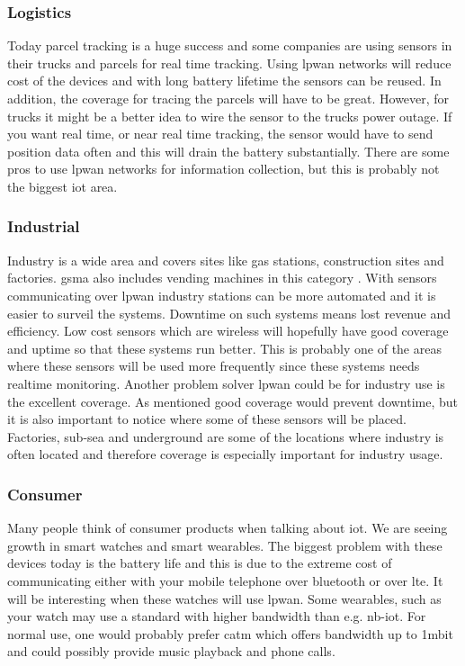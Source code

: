 \documentclass[USenglish]{ifimaster}  %
\begin{document}
\subsubsection{Logistics}
Today parcel tracking is a huge success and some companies are using sensors in their trucks and parcels for real time tracking. Using \acrshort{lpwan} networks will reduce cost of the devices and with long battery lifetime the sensors can be reused. In addition, the coverage for tracing the parcels will have to be great. However, for trucks it might be a better idea to wire the sensor to the trucks power outage. If you want real time, or near real time tracking, the sensor would have to send position data often and this will drain the battery substantially. There are some pros to use \acrshort{lpwan} networks for information collection, but this is probably not the biggest \acrshort{iot} area.

\subsubsection{Industrial}
Industry is a wide area and covers sites like gas stations, construction sites and factories. \acrshort{gsma} also includes vending machines in this category \cite{online:lpwaFuture}. With sensors communicating over \acrshort{lpwan} industry stations can be more automated and it is easier to surveil the systems. Downtime on such systems means lost revenue and efficiency. Low cost sensors which are wireless will hopefully have good coverage and uptime so that these systems run better. This is probably one of the areas where these sensors will be used more frequently since these systems needs realtime monitoring. Another problem solver \acrshort{lpwan} could be for industry use is the excellent coverage. As mentioned good coverage would prevent downtime, but it is also important to notice where some of these sensors will be placed. Factories, sub-sea and underground are some of the locations where industry is often located and therefore coverage is especially important for industry usage.

\subsubsection{Consumer}
Many people think of consumer products when talking about \acrshort{iot}. We are seeing growth in smart watches and smart wearables. The biggest problem with these devices today is the battery life and this is due to the extreme cost of communicating either with your mobile telephone over bluetooth or over \acrshort{lte}. It will be interesting when these watches will use \acrshort{lpwan}. Some wearables, such as your watch may use a standard with higher bandwidth than e.g. \acrshort{nb-iot}. For normal use, one would probably prefer \acrshort{catm} which offers bandwidth up to 1\acrshort{mbit} and could possibly provide music playback and phone calls.
\end{document}
